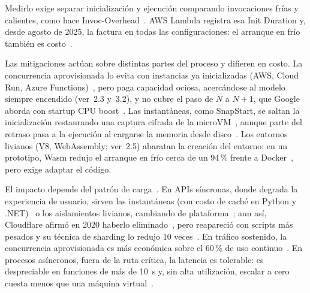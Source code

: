 \documentclass[12pt, letterpaper, table, xcdraw]{inf-pucv}
\begin{document}
Medirlo exige separar inicialización y ejecución comparando invocaciones frías y calientes, como hace Invoc-Overhead~\cite{copik2021sebs}. AWS Lambda registra esa Init Duration y, desde agosto de 2025, la factura en todas las configuraciones: el arranque en frío también es costo~\cite{gupta2025initbilling}.

Las mitigaciones actúan sobre distintas partes del proceso y difieren en costo. La concurrencia aprovisionada lo evita con instancias ya inicializadas (AWS, Cloud Run, Azure Functions)~\cite{aws2023provisionedconcurrency, googlecloudrunmininstances, azurefunctionsflex}, pero paga capacidad ociosa, acercándose al modelo siempre encendido (ver~2.3 y~3.2), y no cubre el paso de $N$ a $N+1$, que Google aborda con startup CPU boost~\cite{giannini2022cpuboost}. Las instantáneas, como SnapStart, se saltan la inicialización restaurando una captura cifrada de la microVM~\cite{aws2022snapstart}, aunque parte del retraso pasa a la ejecución al cargarse la memoria desde disco~\cite{ustiugov2021}. Los entornos livianos (V8, WebAssembly; ver~2.5) abaratan la creación del entorno: en un prototipo, Wasm redujo el arranque en frío cerca de un 94\,\% frente a Docker~\cite{gackstatter2022pushing}, pero exige adaptar el código.

El impacto depende del patrón de carga~\cite{copik2021sebs}. En APIs síncronas, donde degrada la experiencia de usuario, sirven las instantáneas (con costo de caché en Python y .NET)~\cite{aws2022snapstart} o los aislamientos livianos, cambiando de plataforma~\cite{gackstatter2022pushing}; aun así, Cloudflare afirmó en 2020 haberlo eliminado~\cite{cloudflare2020workers}, pero reapareció con scripts más pesados y su técnica de sharding lo redujo 10 veces~\cite{cloudflare2025shard}. En tráfico sostenido, la concurrencia aprovisionada es más económica sobre el 60\,\% de uso continuo~\cite{gupta2025initbilling}. En procesos asíncronos, fuera de la ruta crítica, la latencia es tolerable: es despreciable en funciones de más de 10~s y, sin alta utilización, escalar a cero cuesta menos que una máquina virtual~\cite{copik2021sebs}.%
\end{document}
